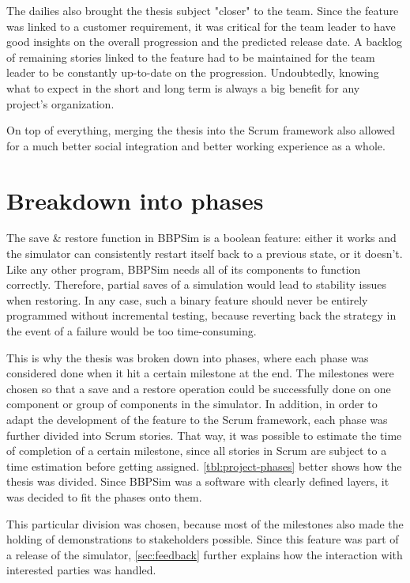 {The dailies also brought the thesis subject "closer" to the team. Since the feature was linked to a customer requirement, it was critical for the team leader to have good insights on the overall progression and the predicted release date. A backlog of remaining stories linked to the feature had to be maintained for the team leader to be constantly up-to-date on the progression. Undoubtedly, knowing what to expect in the short and long term is always a big benefit for any project's organization. 

On top of everything, merging the thesis into the Scrum framework also allowed for a much better social integration and better working experience as a whole. 

\section{Breakdown into phases}
The save \& restore function in \gls{BBPSim} is a boolean feature: either it works and the simulator can consistently restart itself back to a previous state, or it doesn't. Like any other program, \gls{BBPSim} needs all of its components to function correctly. Therefore, partial saves of a simulation would lead to stability issues when restoring. 
In any case, such a binary feature should never be entirely programmed without incremental testing, because reverting back the strategy in the event of a failure would be too time-consuming.

This is why the thesis was broken down into phases, where each phase was considered done when it hit a certain milestone at the end. The milestones were chosen so that a save and a restore operation could be successfully done on one component or group of components in the simulator. In addition, in order to adapt the development of the feature to the Scrum framework, each phase was further divided into Scrum stories. That way, it was possible to estimate the time of completion of a certain milestone, since all stories in Scrum are subject to a time estimation before getting assigned. \autoref{tbl:project-phases} better shows how the thesis was divided. Since \gls{BBPSim} was a software with clearly defined layers, it was decided to fit the phases onto them.

This particular division was chosen, because most of the milestones also made the holding of demonstrations to stakeholders possible. Since this feature was part of a release of the simulator, \autoref{sec:feedback} further explains how the interaction with interested parties was handled.

}
